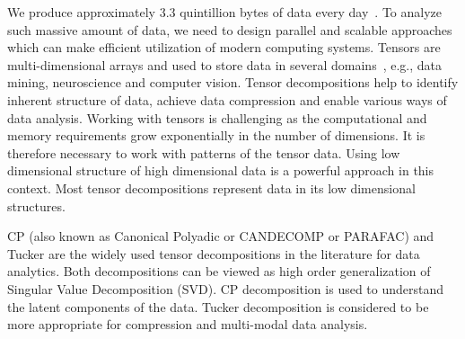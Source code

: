 \documentclass[a4paper,11pt]{article}
\newcommand{\bora}[1]{{\color{magenta} \emph{#1}}}
\newcommand{\sk}[1]{{\color{blue} \emph{#1}}}
\begin{document}
	
	We produce approximately 3.3 quintillion bytes of data every day~\cite{data-size-2024}. To analyze such massive amount of data, we need to design parallel and scalable approaches which can make efficient utilization of modern computing systems. Tensors are multi-dimensional arrays and used to store data in several domains~\cite{KB-SIAM-2009}, e.g., data mining, neuroscience and computer vision. Tensor decompositions help to identify inherent structure of data, achieve data compression and enable various ways of data analysis.
	Working with tensors is challenging as the computational and memory requirements grow exponentially in the number of dimensions. It is therefore necessary to work with patterns of the tensor data. Using low dimensional structure of high dimensional data is a powerful approach in this context. Most tensor decompositions represent data in its low dimensional structures.
	
	

	CP (also known as Canonical Polyadic or CANDECOMP or PARAFAC) and Tucker are the widely used tensor decompositions in the literature for data analytics. Both decompositions can be viewed as high order generalization of Singular Value Decomposition (SVD). CP decomposition is used to understand the latent components of the data. Tucker decomposition is considered to be more appropriate for compression and multi-modal data analysis.
	
\end{document}
